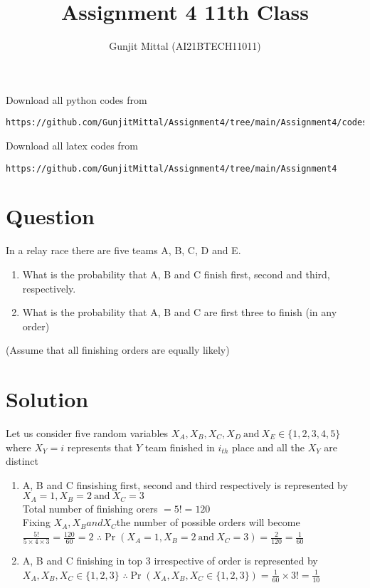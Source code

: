 \documentclass[journal,12pt,twocolumn]{IEEEtran}
\begin{document}
\let\vec\mathbf{}
\def\putbox#1#2#3{\makebox[0in][l]{\makebox[#1][l]{}\raisebox{\baselineskip}[0in][0in]{\raisebox{#2}[0in][0in]{#3}}}}
     \def\rightbox#1{\makebox[0in][r]{#1}}
     \def\centbox#1{\makebox[0in]{#1}}
     \def\topbox#1{\raisebox{-\baselineskip}[0in][0in]{#1}}
     \def\midbox#1{\raisebox{-0.5\baselineskip}[0in][0in]{#1}}
\vspace{3cm}
\title{Assignment 4 11th Class}
\author{Gunjit Mittal (AI21BTECH11011)}
\maketitle
Download all python codes from 
\begin{lstlisting}
https://github.com/GunjitMittal/Assignment4/tree/main/Assignment4/codes
\end{lstlisting}
Download all latex codes from 
\begin{lstlisting}
https://github.com/GunjitMittal/Assignment4/tree/main/Assignment4 
\end{lstlisting} 
\section{Question}
In a relay race there are five teams A, B, C, D and E.\\ 
\begin{enumerate}[label= (\alph*)]
\item What is the probability that A, B and C finish first, second and third,
respectively.\\
\item What is the probability that A, B and C are first three to finish (in any order)
\end{enumerate}
(Assume that all finishing orders are equally likely)
\section{Solution}
\solution{}
Let us consider five random variables $X_A, X_B, X_C, X_D ~\text{and}~ X_E \in \{1,2,3,4,5\}$ where $X_Y=i$ represents that $Y$ team finished in $i_{th}$ place and all the $X_Y$ are distinct
\begin{enumerate}[label= (\alph*)]
    \item A, B and C finsishing first, second and third respectively is represented by $X_A=1, X_B=2 ~\text{and}~  X_C=3$\\
    Total number of finishing orers $= 5! = 120$\\
    Fixing $X_A, X_B and X_C $the number of possible orders will become $\frac{5!}{5\times4\times3}=\frac{120}{60}=2$
    $\therefore \Pr(X_A=1, X_B=2 ~\text{and}~ X_C=3) = \frac{2}{120}=\frac{1}{60}$
    \item A, B and C finishing in top 3 irrespective of order is represented by $X_A,X_B,X_C \in\{1,2,3\}$
    $\therefore \Pr(X_A,X_B,X_C \in\{1,2,3\})=\frac{1}{60}\times3!=\frac{1}{10}$
\end{enumerate}
\end{document}
